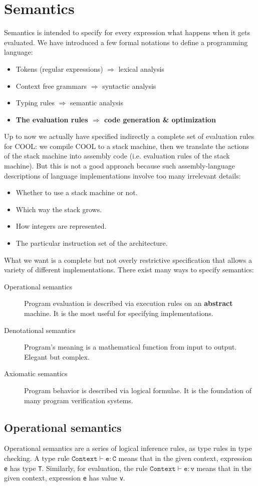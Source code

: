 \section{Semantics}
Semantics is intended to specify for every expression what happens when it gets evaluated. We have introduced a few formal notations to define a programming language:
\begin{itemize}
\item Tokens (regular expressions) $\Rightarrow$ lexical analysis
\item Context free grammars $\Rightarrow$ syntactic analysis
\item Typing rules $\Rightarrow$ semantic analysis
\item {\bf The evaluation rules $\Rightarrow$ code generation \& optimization}
\end{itemize} 
Up to now we actually have specified indirectly a complete set of evaluation rules for COOL: we compile COOL to a stack machine, then we translate the actions of the stack machine into assembly code (i.e. evaluation rules of the stack machine). But this is not a good approach because such assembly-language descriptions of language implementations involve too many irrelevant details:
\begin{itemize}
\item Whether to use a stack machine or not.
\item Which way the stack grows.
\item How integers are represented.
\item The particular instruction set of the architecture.
\end{itemize}
What we want is a complete but not overly restrictive specification that allows a variety of different implementations. There exist many ways to specify semantics:
\begin{description}
\item[Operational semantics]Program evaluation is described via execution rules on an \textbf{abstract} machine. It is the most useful for specifying implementations.
\item[Denotational semantics]Program's meaning is a mathematical function from input to output. Elegant but complex.
\item[Axiomatic semantics]Program behavior is described via logical formulae. It is the foundation of many program verification systems.
\end{description}
\subsection{Operational semantics}
Operational semantics are a series of logical inference rules, as type rules in type checking. A type rule $\mathtt{Context\vdash e:C}$ means that in the given context, expression \texttt{e} has type \texttt{T}. Similarly, for evaluation, the rule $\mathtt{Context\vdash e:v}$ means that in the given context, expression \texttt{e} has value \texttt{v}. 

